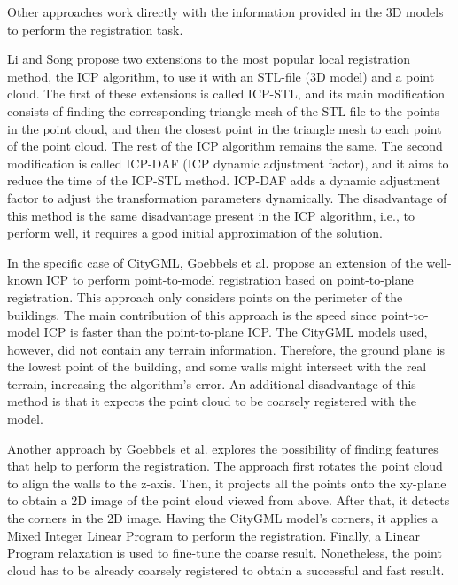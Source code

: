         Other approaches work directly with the information provided in the 3D models to perform the registration task.

        Li and Song \cite{Li_2015_amodified} propose two extensions to the most popular local registration method, the ICP algorithm, 
        to use it with an STL-file (3D model) and a point cloud.
        The first of these extensions is called ICP-STL, and its main modification consists of finding the corresponding triangle mesh of the STL file to the points 
        in the point cloud, and then the closest point in the triangle mesh to each point of the point cloud. The rest of the ICP algorithm remains the same.
        The second modification is called ICP-DAF (ICP dynamic adjustment factor), and it aims to reduce the time of the ICP-STL method. 
        ICP-DAF adds a dynamic adjustment factor to adjust the transformation parameters dynamically.
        The disadvantage of this method is the same disadvantage present in the ICP algorithm, 
        i.e., to perform well, it requires a good initial approximation of the solution.

        In the specific case of CityGML, Goebbels et al. \cite{Goebbels_2019_icpcitygml} propose an extension of the well-known ICP
        to perform point-to-model registration based on point-to-plane registration.
        This approach only considers points on the perimeter of the buildings.
        The main contribution of this approach is the speed since point-to-model ICP is faster than the point-to-plane ICP.
        The CityGML models used, however, did not contain any terrain information.
        Therefore, the ground plane is the lowest point of the building, and some walls might intersect with the real terrain, increasing the algorithm’s error.
        An additional disadvantage of this method is that it expects the point cloud to be coarsely registered with the model.

        Another approach by Goebbels et al. \cite{Goebbels_2018_alinear} explores the possibility of finding features that help to perform the registration.
        The approach first rotates the point cloud to align the walls to the z-axis. Then, it projects all the points onto the 
        xy-plane to obtain a 2D image of the point cloud viewed from above. After that, it detects the corners in the 2D image.
        Having the CityGML model’s corners, it applies a Mixed Integer Linear Program to perform the registration.
        Finally, a Linear Program relaxation is used to fine-tune the coarse result. 
        Nonetheless, the point cloud has to be already coarsely registered to obtain a successful and fast result.

